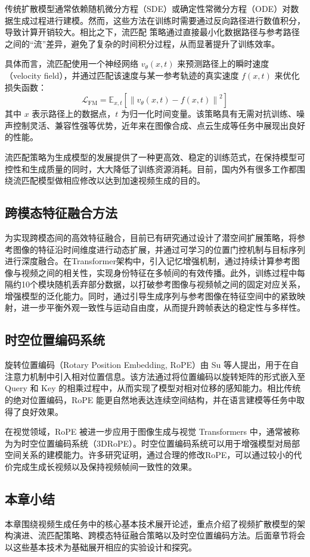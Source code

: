 传统扩散模型通常依赖随机微分方程（SDE）或确定性常微分方程（ODE）对数据生成过程进行建模。然而，这些方法在训练时需要通过反向路径进行数值积分，导致计算开销较大。相比之下，流匹配 策略通过直接最小化数据路径与参考路径之间的“流”差异，避免了复杂的时间积分过程，从而显著提升了训练效率。

具体而言，流匹配使用一个神经网络 $v_\theta(x, t)$ 来预测路径上的瞬时速度（velocity field），并通过匹配该速度与某一参考轨迹的真实速度 $f(x, t)$ 来优化损失函数：
\[
\mathcal{L}_{\text{FM}} = \mathbb{E}_{x, t} \left[ \left\| v_\theta(x, t) - f(x, t) \right\|^2 \right]
\]
其中 $x$ 表示路径上的数据点，$t$ 为归一化时间变量。该策略具有无需对抗训练、噪声控制灵活、兼容性强等优势，近年来在图像合成、点云生成等任务中展现出良好的性能。

流匹配策略为生成模型的发展提供了一种更高效、稳定的训练范式，在保持模型可控性和生成质量的同时，大大降低了训练资源消耗。目前，国内外有很多工作\cite{ke2025proreflow,chen2025pixelflow,sauer2024fast}都围绕流匹配模型做相应修改以达到加速视频生成的目的。
\subsection{跨模态特征融合方法}
为实现跨模态间的高效特征融合，目前已有研究\cite{huang2025conceptmaster}通过设计了潜空间扩展策略，将参考图像的特征沿时间维度进行动态扩展，并通过可学习的位置门控机制与目标序列进行深度融合。在Transformer架构中，引入记忆增强机制，通过持续计算参考图像与视频之间的相关性，实现身份特征在多帧间的有效传播。此外，训练过程中每隔约10个模块随机丢弃部分数据，以打破参考图像与视频帧之间的固定对应关系，增强模型的泛化能力。同时，通过引导生成序列与参考图像在特征空间中的紧致映射，进一步平衡外观一致性与运动自由度，从而提升跨帧表达的稳定性与多样性。
\subsection{时空位置编码系统}
旋转位置编码（Rotary Position Embedding, RoPE）由 Su\cite{su2024roformer} 等人提出，用于在自注意力机制中引入相对位置信息。该方法通过将位置编码以旋转矩阵的形式嵌入至 Query 和 Key 的相乘过程中，从而实现了模型对相对位移的感知能力。相比传统的绝对位置编码，RoPE 能更自然地表达连续空间结构，并在语言建模等任务中取得了良好效果。

在视觉领域，RoPE 被进一步应用于图像生成与视觉 Transformers 中，通常被称为为时空位置编码系统（3DRoPE）。时空位置编码系统可以用于增强模型对局部空间关系的建模能力。许多研究证明，通过合理的修改RoPE，可以通过较小的代价完成生成长视频以及保持视频帧间一致性的效果。
\subsection{本章小结}
本章围绕视频生成任务中的核心基本技术展开论述，重点介绍了视频扩散模型的架构演进、流匹配策略、跨模态特征融合策略以及时空位置编码方法。后面章节将会以这些基本技术为基础展开相应的实验设计和探究。

